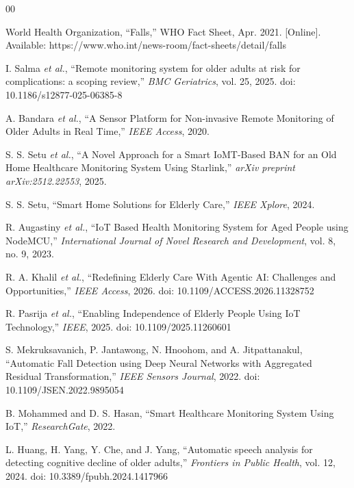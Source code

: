 \documentclass[conference]{IEEEtran}
\begin{document}
\balance
\begin{thebibliography}{00}

World Health Organization, ``Falls,'' WHO Fact Sheet, Apr. 2021. [Online]. Available: https://www.who.int/news-room/fact-sheets/detail/falls

I. Salma \textit{et al.}, ``Remote monitoring system for older adults at risk for complications: a scoping review,'' \textit{BMC Geriatrics}, vol. 25, 2025. doi: 10.1186/s12877-025-06385-8

A. Bandara \textit{et al.}, ``A Sensor Platform for Non-invasive Remote Monitoring of Older Adults in Real Time,'' \textit{IEEE Access}, 2020.

S. S. Setu \textit{et al.}, ``A Novel Approach for a Smart IoMT-Based BAN for an Old Home Healthcare Monitoring System Using Starlink,'' \textit{arXiv preprint arXiv:2512.22553}, 2025.

S. S. Setu, ``Smart Home Solutions for Elderly Care,'' \textit{IEEE Xplore}, 2024.

R. Augastiny \textit{et al.}, ``IoT Based Health Monitoring System for Aged People using NodeMCU,'' \textit{International Journal of Novel Research and Development}, vol. 8, no. 9, 2023.

R. A. Khalil \textit{et al.}, ``Redefining Elderly Care With Agentic AI: Challenges and Opportunities,'' \textit{IEEE Access}, 2026. doi: 10.1109/ACCESS.2026.11328752

R. Pasrija \textit{et al.}, ``Enabling Independence of Elderly People Using IoT Technology,'' \textit{IEEE}, 2025. doi: 10.1109/2025.11260601

S. Mekruksavanich, P. Jantawong, N. Hnoohom, and A. Jitpattanakul, ``Automatic Fall Detection using Deep Neural Networks with Aggregated Residual Transformation,'' \textit{IEEE Sensors Journal}, 2022. doi: 10.1109/JSEN.2022.9895054

B. Mohammed and D. S. Hasan, ``Smart Healthcare Monitoring System Using IoT,'' \textit{ResearchGate}, 2022.

L. Huang, H. Yang, Y. Che, and J. Yang, ``Automatic speech analysis for detecting cognitive decline of older adults,'' \textit{Frontiers in Public Health}, vol. 12, 2024. doi: 10.3389/fpubh.2024.1417966


\end{thebibliography}
\end{document}
